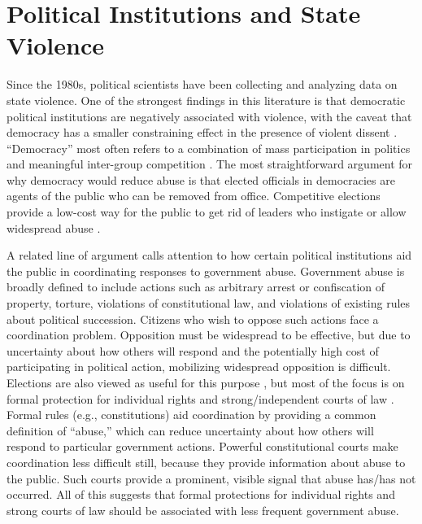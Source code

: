 \documentclass[11pt]{article}
\begin{document}
\section*{Political Institutions and State Violence}

Since the 1980s, political scientists have been collecting and analyzing data on state violence. One of the strongest findings in this literature is that democratic political institutions are negatively associated with violence, with the caveat that democracy has a smaller constraining effect in the presence of violent dissent \citep{Davenport2007AR,Davenport2007,DavenportMooreArmstrong2007,ConradMoore2010}. ``Democracy'' most often refers to a combination of mass participation in politics and meaningful inter-group competition \citep{Dahl1971}. The most straightforward argument for why democracy would reduce abuse is that elected officials in democracies are agents of the public who can be removed from office. Competitive elections provide a low-cost way for the public to get rid of leaders who instigate or allow widespread abuse \citep[e.g.,][]{PoeTate1994}.


A related line of argument calls attention to how certain political institutions aid the public in coordinating responses to government abuse. Government abuse is broadly defined to include actions such as arbitrary arrest or confiscation of property, torture, violations of constitutional law, and violations of existing rules about political succession. Citizens who wish to oppose such actions face a coordination problem. Opposition must be widespread to be effective, but due to uncertainty about how others will respond and the potentially high cost of participating in political action, mobilizing widespread opposition is difficult. Elections are also viewed as useful for this purpose \citep[e.g.,][]{Fearon2011}, but most of the focus is on formal protection for individual rights and strong/independent courts of law \citep{NorthWeingast1989,Weingast1997,Vanberg2005,ElkinsGinsburgMelton2009,PowellStaton2009,Melton2013}. Formal rules (e.g., constitutions) aid coordination by providing a common definition of ``abuse,'' which can reduce uncertainty about how others will respond to particular government actions. Powerful constitutional courts make coordination less difficult still, because they provide information about abuse to the public. Such courts provide a prominent, visible signal that abuse has/has not occurred. All of this suggests that formal protections for individual rights and strong courts of law should be associated with less frequent government abuse. 
\end{document}
